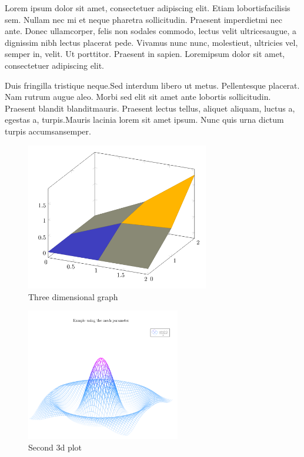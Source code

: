 \documentclass{article}
\begin{document}
\thispagestyle{empty}

\listoffigures

\listoftables

\clearpage


Lorem ipsum dolor sit amet, consectetuer adipiscing elit.  Etiam lobortisfacilisis sem. Nullam nec mi et neque pharetra sollicitudin. Praesent imperdietmi nec ante. Donec ullamcorper, felis non sodales commodo, lectus velit ultricesaugue, a dignissim nibh lectus placerat pede.  Vivamus nunc nunc, molestieut, ultricies vel, semper in, velit.  Ut porttitor.  Praesent in sapien.  Loremipsum dolor sit amet, consectetuer adipiscing elit. 

Duis fringilla tristique neque.Sed interdum libero ut metus.  Pellentesque placerat.  Nam rutrum augue aleo. Morbi sed elit sit amet ante lobortis sollicitudin. Praesent blandit blanditmauris.  Praesent lectus tellus, aliquet aliquam, luctus a, egestas a, turpis.Mauris lacinia lorem sit amet ipsum. Nunc quis urna dictum turpis accumsansemper.

\begin{figure}
\centering
\includegraphics[width=8cm]{Pgfplot3d3}
\caption{Three dimensional graph}
\label{fig:figure1}
\end{figure}

\begin{figure}[h]
\centering
\includegraphics[width=0.6\textwidth]{pgfplots3d1}
\caption{Second 3d plot}
\label{fig:figure2}
\end{figure}
\end{document}
